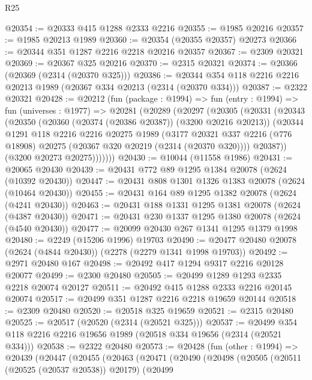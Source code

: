 \begin{lexlean}{R25}
\begin{coremodule}
@20354 := @20333 @415 @1288 @2333 @2216
@20355 := @1985 @20216
@20357 := @1985 @20213 @1989
@20360 := @20354 (@20355 @20357) @20273
@20366 := @20344 @351 @1287 @2216 @2218 @20216 @20357
@20367 := @2309 @20321
@20369 := @20367 @325 @20216
@20370 := @2315 @20321
@20374 := @20366 (@20369 (@2314 (@20370 @325)))
@20386 := @20344 @354 @118 @2216 @2216 @20213 @1989 (@20367 @334 @20213 (@2314 (@20370 @334)))
@20387 := @2322 @20321
@20428 := @20212
    (fun (package : @1994) =>
    fun (entry : @1994) =>
    fun (universes : @1977) =>
    @20281
      (@20289
        (@20297
          (@20305
            (@20331
              (@20343
                (@20350
                  (@20360 (@20374 (@20386 @20387)) (@3200 @20216 @20213))
                  (@20344
                    @1291
                    @118
                    @2216
                    @2216
                    @20275
                    @1989
                    (@3177
                      @20321
                      @337
                      @2216
                      (@776 @18908)
                      @20275
                      (@20367 @320 @20219 (@2314 (@20370 @320))))
                    @20387))
                (@3200 @20273 @20275)))))))
@20430 := @10044 (@11558 @1986)
@20431 := @20065 @20430
@20439 := @20431 @772 @89 @1295 @1384 @20078 (@2624 (@10392 @20430))
@20447 := @20431 @808 @1301 @1326 @1383 @20078 (@2624 (@10464 @20430))
@20455 := @20431 @164 @89 @1295 @1382 @20078 (@2624 (@4241 @20430))
@20463 := @20431 @188 @1331 @1295 @1381 @20078 (@2624 (@4387 @20430))
@20471 := @20431 @230 @1337 @1295 @1380 @20078 (@2624 (@4540 @20430))
@20477 := @20099 @20430 @267 @1341 @1295 @1379 @1998
@20480 := @2249 (@15206 @1996) @19703
@20490 := @20477 @20480 @20078 (@2624 (@4844 @20430)) (@2278 (@2279 @1341 @1998 @19703))
@20492 := @2971 @20480 @167
@20498 := @20492 @417 @1294 @9317 @2216 @20128 @20077
@20499 := @2300 @20480
@20505 := @20499 @1289 @1293 @2335 @2218 @20074 @20127
@20511 := @20492 @415 @1288 @2333 @2216 @20145 @20074
@20517 := @20499 @351 @1287 @2216 @2218 @19659 @20144
@20518 := @2309 @20480
@20520 := @20518 @325 @19659
@20521 := @2315 @20480
@20525 := @20517 (@20520 (@2314 (@20521 @325)))
@20537 := @20499 @354 @118 @2216 @2216 @19656 @1989 (@20518 @334 @19656 (@2314 (@20521 @334)))
@20538 := @2322 @20480
@20573 := @20428
    (fun (other : @1994) =>
    @20439
      (@20447
        (@20455
          (@20463
            (@20471
              (@20490
                (@20498
                  (@20505
                    (@20511 (@20525 (@20537 @20538)) @20179)
                    (@20499

\end{coremodule}
\end{lexlean}
